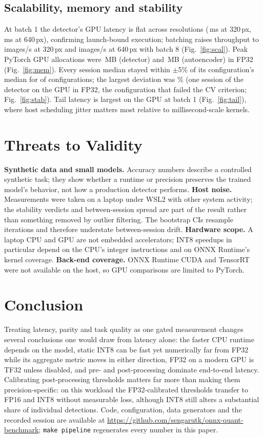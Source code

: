 \documentclass[conference]{IEEEtran}
\begin{document}
\subsection{Scalability, memory and stability}
At batch 1 the detector's GPU latency is flat across resolutions (\,ms at 320\,px,
\,ms at 640\,px), confirming launch-bound execution; batching raises throughput to
 images/s at 320\,px and  images/s at 640\,px with batch 8 (Fig.~\ref{fig:scal}).
Peak PyTorch GPU allocations were \,MB (detector) and \,MB
(autoencoder) in FP32 (Fig.~\ref{fig:mem}). Every session median stayed within $\pm$5\% of its configuration's
median for  of  configurations; the largest deviation was \% (one
session of the detector on the GPU in FP32, the configuration that failed the CV criterion; Fig.~\ref{fig:stab}).
Tail latency is largest on the GPU at batch 1 (Fig.~\ref{fig:tail}), where host scheduling jitter matters most relative to
millisecond-scale kernels.

\section{Threats to Validity}\label{sec:threats}
\textbf{Synthetic data and small models.} Accuracy numbers describe a controlled synthetic task; they show whether a
runtime or precision preserves the trained model's behavior, not how a production detector performs.
\textbf{Host noise.} Measurements were taken on a laptop under WSL2 with other system activity; the stability verdicts
and between-session spread are part of the result rather than something removed by outlier filtering. The bootstrap
CIs resample iterations and therefore understate between-session drift.
\textbf{Hardware scope.} A laptop CPU and GPU are not embedded accelerators; INT8 speedups in particular depend on the
CPU's integer instructions and on ONNX Runtime's kernel coverage.
\textbf{Back-end coverage.} ONNX Runtime CUDA and TensorRT were not available on the host, so GPU comparisons are
limited to PyTorch.

\section{Conclusion}
Treating latency, parity and task quality as one gated measurement changes several conclusions one would draw from
latency alone: the faster CPU runtime depends on the model, static INT8 can be fast yet numerically far from FP32 while
its aggregate metric moves in either direction, FP32 on a modern GPU is TF32 unless disabled, and pre- and
post-processing dominate end-to-end latency. Calibrating post-processing thresholds matters far more than making them
precision-specific: on this workload the FP32-calibrated thresholds transfer to FP16 and INT8 without measurable loss,
although INT8 still alters a substantial share of individual detections.
Code, configuration, data generators and the recorded session are available at
\url{https://github.com/sengarutk/onnx-quant-benchmark}; \texttt{make pipeline} regenerates every number in this paper.



\end{document}
